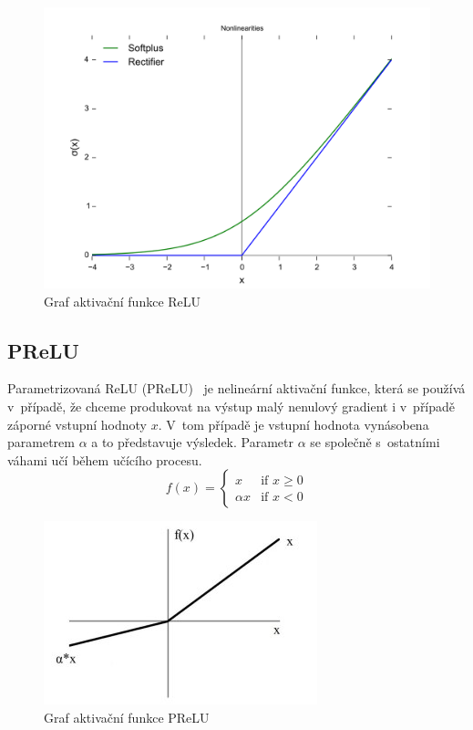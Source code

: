 \begin{figure}[H]
    \centering
    \includegraphics[scale=0.2]{obrazky-figures/ReLU.png}
    \caption{\label{fig:relu}Graf aktivační funkce ReLU}
\end{figure}




\subsection*{PReLU}
Parametrizovaná ReLU (PReLU)~\cite{he2015delving} je nelineární aktivační funkce, která se používá v~případě, že chceme produkovat na výstup malý nenulový gradient i v~případě záporné vstupní hodnoty $x$. V~tom případě je vstupní hodnota vynásobena parametrem $\alpha$ a to představuje výsledek. Parametr $\alpha$ se společně s~ostatními váhami učí během učícího procesu.
\begin{equation}
  f(x) =
  \begin{cases}
    x & \text{if } x \geq 0 \\
    {\alpha}x & \text{if } x < 0
  \end{cases}
\end{equation}

\begin{figure}[H]
    \centering
    \includegraphics[scale=1.4]{obrazky-figures/prelu.jpg}
    \caption{\label{fig:prelu}Graf aktivační funkce PReLU}
\end{figure}


